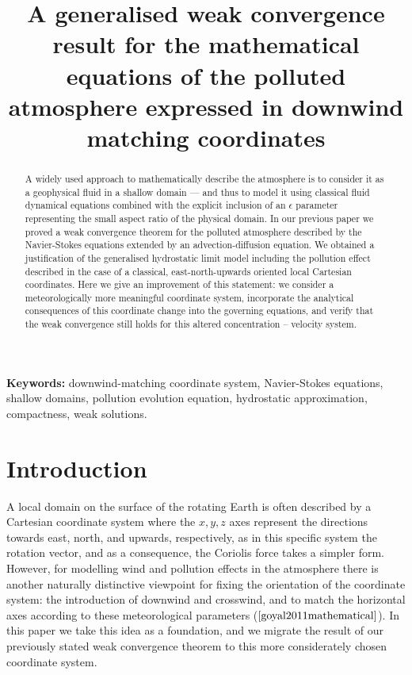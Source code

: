 \documentclass[11pt]{article}
\title{A generalised weak convergence result for the mathematical equations of the polluted atmosphere expressed in downwind matching coordinates}
\date{}
\begin{document}
\maketitle

\begin{abstract}

A widely used approach to mathematically describe the atmosphere is to consider it as a geophysical fluid in a shallow domain --- and thus to model it using classical fluid dynamical equations combined with the explicit inclusion of an $\epsilon$ parameter representing the small aspect ratio of the physical domain. In our previous paper we proved a weak convergence theorem for the polluted atmosphere described by the Navier-Stokes equations extended by an advection-diffusion equation. We obtained a justification of the generalised hydrostatic limit model including the pollution effect described in the case of a classical, east-north-upwards oriented local Cartesian coordinates. Here we give an improvement of this statement: we consider a meteorologically more meaningful coordinate system, incorporate the analytical consequences of this coordinate change into the governing equations, and verify that the weak convergence still holds for this altered concentration -- velocity system.

\end{abstract}

{\bf Keywords:} downwind-matching coordinate system, Navier-Stokes equations, shallow domains, pollution evolution equation, hydrostatic approximation, compactness, weak solutions.

\newpage

\tableofcontents
\newpage

\section{Introduction} \label{Introduction}

A local domain on the surface of the rotating Earth is often described by a Cartesian coordinate system where the $x, y, z$ axes represent the directions towards east, north, and upwards, respectively, as in this specific system the rotation vector, and as a consequence, the Coriolis force takes a simpler form. However, for modelling wind and pollution effects in the atmosphere there is another naturally distinctive viewpoint for fixing the orientation of the coordinate system: the introduction of downwind and crosswind, and to match the horizontal axes according to these meteorological parameters ($\cite{goyal2011mathematical}$). In this paper we take this idea as a foundation, and we migrate the result of our previously stated weak convergence theorem to this more considerately chosen coordinate system.
\end{document}
